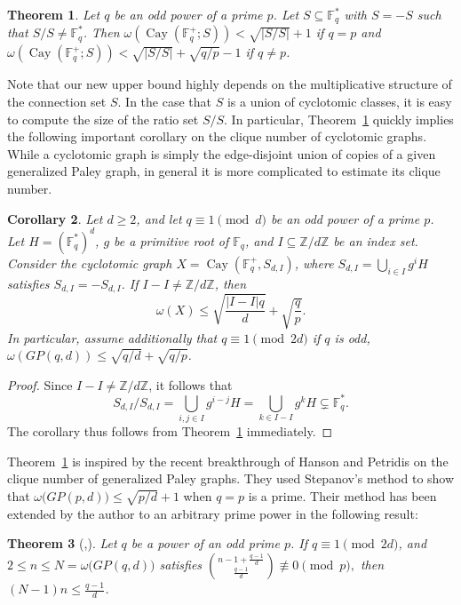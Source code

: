 \documentclass[12pt,reqno]{amsart}
\newtheorem{thm}{Theorem}[section]
\newtheorem{cor}[thm]{Corollary}
\theoremstyle{definition}
\newcommand{\Z}{\mathbb{Z}}
\newcommand{\F}{\mathbb{F}}
\begin{document}
\begin{thm}\label{thm:Cayley}
Let $q$ be an odd power of a prime $p$. Let $S \subseteq \F_q^*$ with $S=-S$ such that $S/S \neq \F_q^*$. Then $\omega(\operatorname{Cay}(\F_q^+;S))< \sqrt{|S/S|}+1$ if $q=p$ and $\omega(\operatorname{Cay}(\F_q^+;S))< \sqrt{|S/S|}+\sqrt{q/p}-1$ if $q \neq p$.
\end{thm}

Note that our new upper bound highly depends on the multiplicative structure of the connection set $S$. In the case that $S$ is a union of cyclotomic classes, it is easy to compute the size of the ratio set $S/S$. In particular, Theorem~\ref{thm:Cayley} quickly implies the following important corollary on the clique number of cyclotomic graphs. While a cyclotomic graph is simply the edge-disjoint union of copies of a given generalized Paley graph, in general it is more complicated to estimate its clique number.

\begin{cor}\label{cor:main}
Let $d \geq 2$, and let $q \equiv 1 \pmod {d}$ be an odd power of a prime $p$. Let $H=(\F_q^*)^d$, $g$ be a primitive root of $\F_q$, and $I \subseteq \Z/d\Z$ be an index set. Consider the cyclotomic graph $X=\operatorname{Cay}(\F_q^+, S_{d,I})$, where $S_{d, I}=\bigcup_{i \in I} g^i H$ satisfies $S_{d,I}=-S_{d,I}$. If $I-I \neq \Z/d\Z$, then 
$$
\omega(X) \leq \sqrt{\frac{|I-I|q}{d}}+\sqrt{\frac{q}{p}}.
$$    
In particular, assume additionally that $q\equiv 1 \pmod {2d}$ if $q$ is odd, $\omega(GP(q,d))\leq  \sqrt{q/d}+\sqrt{q/p}$. 
\end{cor}
\begin{proof}
Since $I-I \neq \Z/d\Z$, it follows that 
$$S_{d,I}/S_{d,I}=\bigcup_{i,j \in I} g^{i-j} H=\bigcup_{k \in I-I} g^k H \subsetneq \F_q^*.$$
The corollary thus follows from Theorem~\ref{thm:Cayley} immediately.
\end{proof}

Theorem~\ref{thm:Cayley} is inspired by the recent breakthrough of Hanson and Petridis \cite{HP} on the clique number of generalized Paley graphs. They used Stepanov's method \cite{S69} to show that $\omega\big(GP(p,d)\big)\leq \sqrt{p/d}+1$ when $q=p$ is a prime. Their method has been extended by the author to an arbitrary prime power \cite{Yip2, Yip1} in the following result:

\begin{thm}[{\cite{HP},\cite[Theorem 5.8]{Yip2}}] \label{thm:Nn}
Let $q$ be a power of an odd prime $p$. If $q\equiv 1 \pmod{2d}$, and $2 \leq n\leq N=\omega\big(GP(q,d)\big)$ satisfies
$
\binom{n-1+\frac{q-1}{d}}{\frac{q-1}{d}}\not \equiv 0 \pmod p,
$
then $(N-1)n \leq \frac{q-1}{d}$.
\end{thm}
\end{document}

